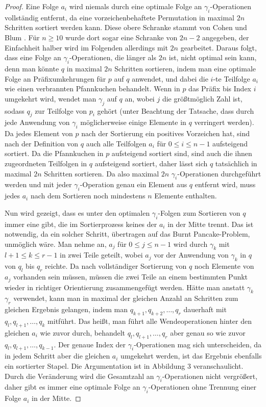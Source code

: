 \documentclass[a4paper, 10pt, ngerman]{article}
\begin{document}
\begin{proof}
    Eine Folge $a_i$ wird niemals durch eine optimale Folge an $\gamma_i$-Operationen vollständig entfernt, da eine vorzeichenbehaftete Permutation in maximal $2n$ Schritten sortiert werden kann. Diese obere Schranke stammt von Cohen und Blum \cite{burntpancakes}. Für $n \ge 10$ wurde dort sogar eine Schranke von $2n - 2$ angegeben, der Einfachheit halber wird im Folgenden allerdings mit $2n$ gearbeitet. Daraus folgt, dass eine Folge an $\gamma_i$-Operationen, die länger als $2n$ ist, nicht optimal sein kann, denn man könnte $q$ in maximal $2n$ Schritten sortieren, indem man eine optimale Folge an Präfixumkehrungen für $p$ auf $q$ anwendet, und dabei die $i$-te Teilfolge $a_i$ wie einen verbrannten Pfannkuchen behandelt. Wenn in $p$ das Präfix bis Index $i$ umgekehrt wird, wendet man $\gamma_j$ auf $q$ an, wobei $j$ die größtmöglich Zahl ist, sodass $q_j$ zur Teilfolge von $p_i$ gehört (unter Beachtung der Tatsache, dass durch jede Anwendung von $\gamma_i$ möglicherweise einige Elemente in $q$ verringert werden). Da jedes Element von $p$ nach der Sortierung ein positives Vorzeichen hat, sind nach der Definition von $q$ auch alle Teilfolgen $a_i$ für $0 \le i \le n - 1$ aufsteigend sortiert. Da die Pfannkuchen in $p$ aufsteigend sortiert sind, sind auch die ihnen zugeordneten Teilfolgen in $q$ aufsteigend sortiert, daher lässt sich $q$ tatsächlich in maximal $2n$ Schritten sortieren. Da also maximal $2n$ $\gamma_i$-Operationen durchgeführt werden und mit jeder $\gamma_i$-Operation genau ein Element aus $q$ entfernt wird, muss jedes $a_i$ nach dem Sortieren noch mindestens $n$ Elemente enthalten.

    Nun wird gezeigt, dass es unter den optimalen $\gamma_i$-Folgen zum Sortieren von $q$ immer eine gibt, die im Sortierprozess keines der $a_i$ in der Mitte trennt. Das ist notwendig, da ein solcher Schritt, übertragen auf das Burnt Pancake-Problem, unmöglich wäre. Man nehme an, $a_j$ für $0 \le j \le n - 1$ wird durch $\gamma_k$ mit $l + 1 \le k \le r-1$ in zwei Teile geteilt, wobei $a_j$ vor der Anwendung von $\gamma_k$ in $q$ von $q_l$ bis $q_r$ reichte. Da nach vollständiger Sortierung von $q$ noch Elemente von $a_j$ vorhanden sein müssen, müssen die zwei Teile an einem bestimmten Punkt wieder in richtiger Orientierung zusammengefügt werden. Hätte man anstatt $\gamma_k$ $\gamma_r$ verwendet, kann man in maximal der gleichen Anzahl an Schritten zum gleichen Ergebnis gelangen, indem man $q_{k + 1}, q_{k + 2}, \dots, q_r$ dauerhaft mit $q_l, q_{l+1}, \dots, q_{k}$ mitführt. Das heißt, man führt alle Wendeoperationen hinter den gleichen $a_i$ wie zuvor durch, behandelt $q_l, q_{l+1}, \dots, q_r$ aber genau so wie zuvor $q_l, q_{l+1}, \dots, q_{k-1}$. Der genaue Index der $\gamma_i$-Operationen mag sich unterscheiden, da in jedem Schritt aber die gleichen $a_i$ umgekehrt werden, ist das Ergebnis ebenfalls ein sortierter Stapel. Die Argumentation ist in Abbildung 3 veranschaulicht. Durch die Veränderung wird die Gesamtzahl an $\gamma_i$-Operationen nicht vergrößert, daher gibt es immer eine optimale Folge an $\gamma_i$-Operationen ohne Trennung einer Folge $a_i$ in der Mitte.


\end{proof}
\end{document}
